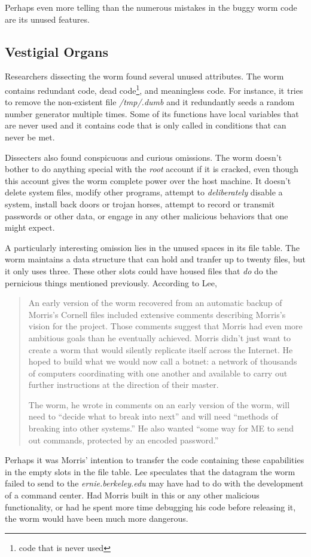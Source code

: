Perhaps even more telling than the numerous mistakes in the buggy worm code
are its unused features.


\subsection*{Vestigial Organs}

Researchers dissecting the worm found several
unused attributes. The worm contains redundant code, dead code\footnote{code
that is never used}, and meaningless code. For instance, it tries to remove the
non-existent file \textit{/tmp/.dumb} and it redundantly seeds a random number
generator multiple times. Some of its functions have local variables that are
never used and it contains code that is only called in conditions that can
never be met. 

Dissecters also found conspicuous and curious omissions. The worm doesn't bother
to do anything special with the \textit{root} account if it is cracked, even
though this account gives the worm complete power over the host machine.
It doesn't delete system files, modify other programs, attempt to
\textit{deliberately} disable a system, install back doors or trojan horses,
attempt to record or transmit passwords or other data, or engage in any other
malicious behaviors that one might expect. 

A particularly interesting omission lies in the unused spaces in its file table.
The worm maintains a data structure that can hold and tranfer
up to twenty files, but it only uses three. These other slots could have
housed files that \textit{do} do the pernicious things
mentioned previously. According to Lee\cite{lee_washpost_2013},

\begin{quote}
An early version of the worm recovered from an automatic backup of Morris's
Cornell files included extensive comments describing Morris's vision for the
project. Those comments suggest that Morris had even more ambitious goals than
he eventually achieved. Morris didn't just want to create a worm that would
silently replicate itself across the Internet. He hoped to build what we would
now call a botnet: a network of thousands of computers coordinating with one
another and available to carry out further instructions at the direction of
their master.

The worm, he wrote in comments on an early version of the worm, will need to
``decide what to break into next'' and will need ``methods of breaking into other
systems.'' He also wanted ``some way for ME to send out commands, protected by an
encoded password.''
\end{quote}

Perhaps it was Morris' intention to transfer the code containing these
capabilities in the empty slots in the file table. Lee\cite{lee_washpost_2013}
speculates that the datagram the worm failed to send to the 
\textit{ernie.berkeley.edu} may have had to do with the development of a
command center. Had Morris built in this or any other malicious functionality,
or had he spent more time debugging his code before releasing it, the
worm would have been much more dangerous.

